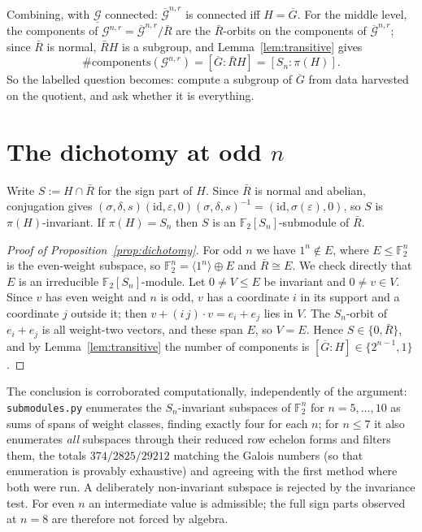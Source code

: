 \documentclass[11pt]{amsart}
\theoremstyle{remark}
\newcommand{\FF}{\mathbb{F}}
\newcommand{\Gb}{\overline{\mathcal{G}}}
\newcommand{\Gm}{\mathcal{G}}
\newcommand{\Gu}{\underline{\mathcal{G}}}
\newcommand{\Gbar}{\overline{G}}
\begin{document}
Combining, with $\Gu$ connected: $\Gb^{n,r}$ is connected iff
$H=\Gbar$. For the middle level, the components of
$\Gm^{n,r}=\Gb^{n,r}/\bar R$ are the $\bar R$-orbits on the components of
$\Gb^{n,r}$; since $\bar R$ is normal, $\bar R H$ is a subgroup, and
Lemma~\ref{lem:transitive} gives
\[
  \#\mathrm{components}(\Gm^{n,r})=[\Gbar:\bar R H]=[S_n:\pi(H)] .
\]
So the labelled question becomes: compute a subgroup of $\Gbar$ from data
harvested on the quotient, and ask whether it is everything.

\section{The dichotomy at odd $n$}\label{sec:dichotomy}

Write $S:=H\cap\bar R$ for the sign part of $H$. Since $\bar R$ is normal
and abelian, conjugation gives
$(\sigma,\delta,s)(\mathrm{id},\varepsilon,0)(\sigma,\delta,s)^{-1}
 =(\mathrm{id},\sigma(\varepsilon),0)$, so $S$ is $\pi(H)$-invariant. If
$\pi(H)=S_n$ then $S$ is an $\FF_2[S_n]$-submodule of $\bar R$.

\begin{proof}[Proof of Proposition~\ref{prop:dichotomy}]
For odd $n$ we have $1^n\notin E$, where $E\le\FF_2^n$ is the even-weight
subspace, so $\FF_2^n=\langle 1^n\rangle\oplus E$ and $\bar R\cong E$. We
check directly that $E$ is an irreducible $\FF_2[S_n]$-module. Let
$0\ne V\le E$ be invariant and $0\ne v\in V$. Since $v$ has even weight
and $n$ is odd, $v$ has a coordinate $i$ in its support and a coordinate
$j$ outside it; then $v+(i\,j)\cdot v=e_i+e_j$ lies in $V$. The
$S_n$-orbit of $e_i+e_j$ is all weight-two vectors, and these span $E$,
so $V=E$. Hence $S\in\{0,\bar R\}$, and by Lemma~\ref{lem:transitive} the
number of components is $[\Gbar:H]\in\{2^{n-1},1\}$.
\end{proof}

The conclusion is corroborated computationally, independently of the
argument: \texttt{submodules.py} enumerates the $S_n$-invariant subspaces
of $\FF_2^n$ for $n=5,\dots,10$ as sums of spans of weight classes,
finding exactly four for each $n$; for $n\le 7$ it also enumerates
\emph{all} subspaces through their reduced row echelon forms and filters
them, the totals $374/2825/29212$ matching the Galois numbers (so that
enumeration is provably exhaustive) and agreeing with the first method
where both were run. A deliberately non-invariant subspace is rejected by
the invariance test. For even $n$ an intermediate value is admissible;
the full sign parts observed at $n=8$ are therefore not forced by
algebra.
\end{document}
